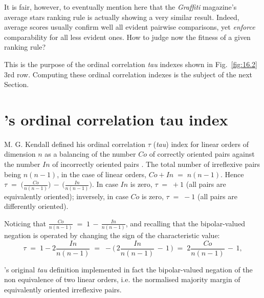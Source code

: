 It is fair, however, to eventually mention here that the \emph{Graffiti} magazine's average stars ranking rule is actually showing a very similar result. Indeed, average scores usually confirm well all evident pairwise comparisons, yet \emph{enforce} comparability for all less evident ones. How to judge now the fitness of a given ranking rule?

This is the purpose of the ordinal correlation \emph{tau} indexes shown in Fig.~\vref{fig:16.2} 3rd row. Computing these ordinal correlation indexes is the subject of the next Section.
 
\section{\Kendall 's ordinal correlation tau index}
\label{sec:16:2}

M. G. Kendall defined his ordinal correlation $\tau$ (\emph{tau}) index for linear orders of dimension $n$ as a balancing of the number $Co$ of correctly oriented pairs against the number $In$ of incorrectly oriented pairs \citep{KEN-1938}. The total number of irreflexive pairs being $n(n-1)$, in the case of linear orders, $Co + In \;=\; n(n-1)$.  Hence $\tau \;=\; \big(\frac{Co}{n(n-1)}\big) \,-\, \big(\frac{In}{n(n-1)}\big)$. In case $In$ is zero, $\tau \;=\; +1$  (all pairs are equivalently oriented); inversely, in case $Co$ is zero, $\tau \;=\; -1$ (all pairs are differently oriented).

Noticing that $\frac{Co}{n(n-1)} \;=\; 1 \,-\, \frac{In}{n(n-1)}$, and recalling that the bipolar-valued negation is operated by changing the sign of the characteristic value:
\begin{equation}
      \tau \;=\; 1 -2\frac{In}{n(n-1)} \;=\; -\big(\,2\frac{In}{n(n-1)} \,-\, 1\,\big) \;=\; 2\frac{Co}{n(n-1)} \,-\, 1,
\end{equation} 

\Kendall 's original \emph{tau} definition implemented in fact the bipolar-valued negation of the non equivalence of two linear orders, i.e. the normalised majority margin of equivalently oriented irreflexive pairs.

